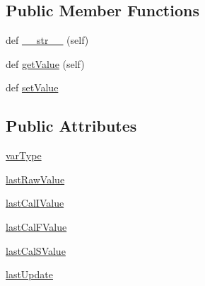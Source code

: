 \subsection*{Public Member Functions}
\begin{DoxyCompactItemize}
\item 
def \hyperlink{class_ground_segment_1_1models_1_1_tlmy_var_type_1_1_tlmy_var_type_ada8f03c46e8d44e5325d8b1e146761ce}{\+\_\+\+\_\+str\+\_\+\+\_\+} (self)
\item 
def \hyperlink{class_ground_segment_1_1models_1_1_tlmy_var_type_1_1_tlmy_var_type_a2e95f578edd5b376c3f4798900bbb3cf}{get\+Value} (self)
\item 
def \hyperlink{class_ground_segment_1_1models_1_1_tlmy_var_type_1_1_tlmy_var_type_aa035c709edd4f261ad5ca70be85636a3}{set\+Value}
\end{DoxyCompactItemize}
\subsection*{Public Attributes}
\begin{DoxyCompactItemize}
\item 
\hyperlink{class_ground_segment_1_1models_1_1_tlmy_var_type_1_1_tlmy_var_type_a3b48452b095327f2cefab2aec6b48c9b}{var\+Type}
\item 
\hyperlink{class_ground_segment_1_1models_1_1_tlmy_var_type_1_1_tlmy_var_type_ad87b579e5f188466f53b239199e52861}{last\+Raw\+Value}
\item 
\hyperlink{class_ground_segment_1_1models_1_1_tlmy_var_type_1_1_tlmy_var_type_a26e2e133172878436da42acf364a07d7}{last\+Cal\+I\+Value}
\item 
\hyperlink{class_ground_segment_1_1models_1_1_tlmy_var_type_1_1_tlmy_var_type_addfc93bd7287219c19e1c68dcd72be80}{last\+Cal\+F\+Value}
\item 
\hyperlink{class_ground_segment_1_1models_1_1_tlmy_var_type_1_1_tlmy_var_type_ad9cbf2bf14489a1a6c2908eb67076ca4}{last\+Cal\+S\+Value}
\item 
\hyperlink{class_ground_segment_1_1models_1_1_tlmy_var_type_1_1_tlmy_var_type_acd348562666a80fe077f5e1809bde3d5}{last\+Update}
\end{DoxyCompactItemize}
